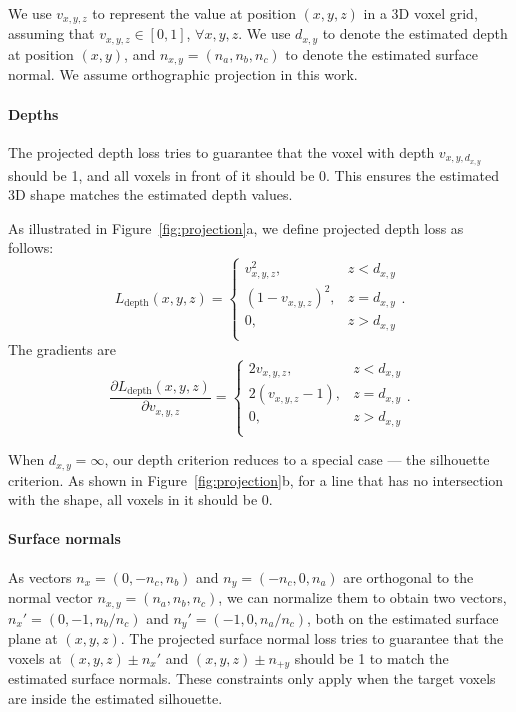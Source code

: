 \documentclass{article}
\newcommand{\fig}[1]{Figure~\ref{#1}}
\newcommand{\myparagraph}[1]{\vspace{-3pt}\paragraph{#1}}
\begin{document}
We use $v_{x, y, z}$ to represent the value at position $(x, y, z)$ in a 3D voxel grid, assuming that $v_{x, y, z}\in[0,1]$, $\forall x, y, z$. We use $d_{x, y}$ to denote the estimated depth at position $(x, y)$, and $n_{x, y} = (n_a, n_b, n_c)$ to denote the estimated surface normal. We assume orthographic projection in this work. 

\myparagraph{Depths}
The projected depth loss tries to guarantee that the voxel with depth $v_{x, y, d_{x, y}}$ should be 1, and all voxels in front of it should be $0$. This ensures the estimated 3D shape matches the estimated depth values.

As illustrated in \fig{fig:projection}a, we define projected depth loss as follows:
\begin{equation}
		L_\text{depth}(x, y, z) = 
		\begin{cases}
			v^2_{x, y, z}, & z < d_{x, y} \\
			(1 - v_{x, y, z})^2, & z = d_{x, y} \\
			0, & z > d_{x, y} \\
		\end{cases}.
\end{equation}
The gradients are
\begin{equation}
		\frac{\partial{L_\text{depth}(x, y, z)}}{\partial{v_{x, y, z}}} =
		\begin{cases}
			2 v_{x, y, z}, & z < d_{x, y} \\
			2 (v_{x, y, z} - 1), & z = d_{x, y} \\
			0, & z > d_{x, y} \\
		\end{cases}.
\end{equation}

When $d_{x,y}=\infty$, our depth criterion reduces to a special case --- the silhouette criterion. As shown in \fig{fig:projection}b, for a line that has no intersection with the shape, all voxels in it should be 0.
	
\myparagraph{Surface normals}
As vectors $n_x = (0, -n_c, n_b)$ and $n_y = (-n_c, 0, n_a)$ are orthogonal to the normal vector $n_{x, y} = (n_a, n_b, n_c)$, we can normalize them to obtain two vectors, $n_x' = (0, -1, n_b/n_c)$ and $n_y' = (-1, 0, n_a/n_c)$, both on the estimated surface plane at $(x, y, z)$. The projected surface normal loss tries to guarantee that the voxels at $(x, y, z) \pm n_x'$ and $(x, y, z) \pm n_{+y}$ should be 1 to match the estimated surface normals. These constraints only apply when the target voxels are inside the estimated silhouette.
\end{document}
